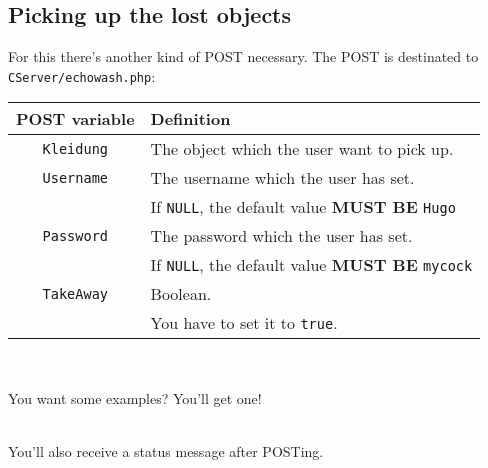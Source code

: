 \documentclass[letterpaper,twoside]{scrartcl}
\begin{document}
  \subsection{Picking up the lost objects}
   For this there's another kind of POST necessary.\newline
   The POST is destinated to \texttt{CServer/echowash.php}:\newline\newline
   \begin{tabular}[ht]{|c|l|}
    \hline
    POST variable & Definition\\
    \hline\hline
    \texttt{Kleidung} & The object which the user want to pick up.\\
    \hline
    \texttt{Username} & The username which the user has set.\\
 		   & If \texttt{NULL}, the default value \textbf{MUST BE} \texttt{Hugo}\\
    \hline
    \texttt{Password} & The password which the user has set.\\
		   & If \texttt{NULL}, the default value \textbf{MUST BE} \texttt{mycock}\\
    \hline
    \texttt{TakeAway} & Boolean. \\
 	  & You have to set it to \texttt{true}. \\
    \hline
   \end{tabular}
   \\
   \newline

   You want some examples? You'll get one!
   \newline
   \newline\newline


   \\
   \newline
   You'll also receive a status message after POSTing.\newline\newline
\end{document}

